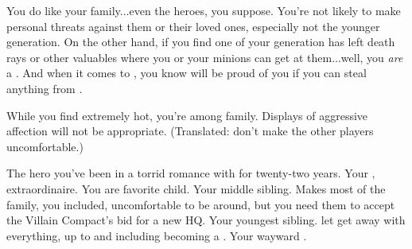 \documentclass[char]{LRSguildcamp1}
\begin{document}
\begin{itemz}[Notes]
	\item You do like your family...even the heroes, you suppose.  You're not likely to make personal threats against them or their loved ones, especially not the younger generation.  On the other hand, if you find one of your generation has left death rays or other valuables where you or your minions can get at them...well, you \emph{are} a \cOldest{\villain}.  And when it comes to \cGrandma{\Parent}, you know \cGrandma{\they} will be proud of you if you can steal anything from \cGrandma{\them}. 
	\item While you find \cOS{} extremely hot, you're among family.  Displays of aggressive affection will not be appropriate.  (Translated: don't make the other players uncomfortable.)
\end{itemz}

\begin{contacts}
	\contact{\cOS{}} The hero you've been in a torrid romance with for twenty-two years.
	\contact{\cGrandma{}} Your \cGrandma{\parent}, \cGrandma{\villain} extraordinaire.  You are \cGrandma{\their} favorite child.
	\contact{\cArchitect{}} Your middle sibling.  Makes most of the family, you included, uncomfortable to be around, but you need them to accept the Villain Compact's bid for a new HQ.
	\contact{\cYoungest{}} Your youngest sibling.  \cGrandma{\Parent} let \cYoungest{\them} get away with everything, up to and including becoming a \cYoungest{\hero}.
	\contact{\cGrad{}} Your wayward \cGrad{\offspring}.
\end{contacts}
\end{document}
